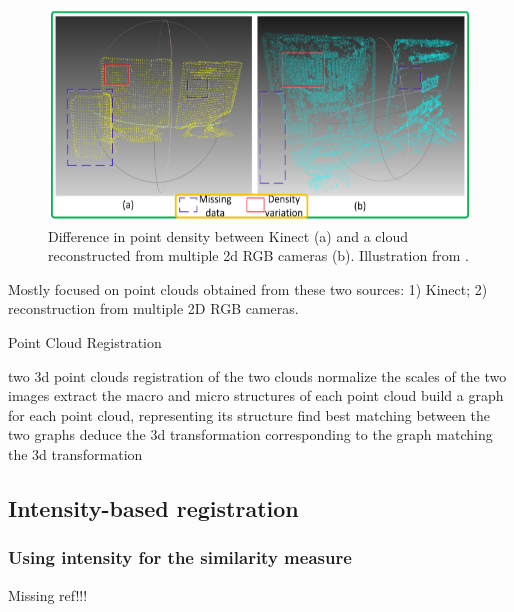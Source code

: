 \documentclass[11pt]{article} %
\begin{document}
\begin{figure}
  \centering
  \includegraphics[width= \linewidth]{kinect.png}
  \caption{Difference in point density between Kinect (a) and a cloud reconstructed from multiple 2d RGB cameras (b). Illustration from \cite{huang:kinect}.}
  \label{fig:kinect}
\end{figure}

Mostly focused on point clouds obtained from these two sources: 1) Kinect; 2) reconstruction from multiple 2D RGB cameras. 
\begin{algorithm}
\caption{Point Cloud Registration \cite{huang:kinect}}
\label{algo:kinect}
\begin{algorithmic}
  \REQUIRE two 3d point clouds
  \ENSURE registration of the two clouds
  \STATE normalize the scales of the two images
  \STATE extract the macro and micro structures of each point cloud
  \STATE build a graph for each point cloud, representing its structure
  \STATE find best matching between the two graphs
  \STATE deduce the 3d transformation corresponding to the graph matching
  \RETURN the 3d transformation
\end{algorithmic}
\end{algorithm}
  
  \subsection{Intensity-based registration}
    \subsubsection{Using intensity for the similarity measure}
 Missing ref!!!
\end{document}
